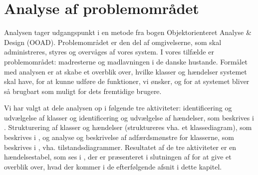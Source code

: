 \chapter{Analyse af problemområdet}
\label{chap:analyseafpo}

Analysen tager udgangspunkt i en metode fra bogen Objektorienteret Analyse \& Design (OOAD)\cite[s. ~43]{ooad}. Problemområdet er den del af omgivelserne, som skal administreres, styres og overvåges af vores system. I vores tilfælde er problemområdet: madresterne og madlavningen i de danske hustande. Formålet med analysen er at skabe et overblik over, hvilke klasser og hændelser systemet skal have, for at kunne udføre de funktioner, vi ønsker, og for at systemet bliver så brugbart som muligt for dets fremtidige brugere. 

Vi har valgt at dele analysen op i følgende tre aktiviteter: identificering og udvælgelse af klasser og identificering og udvælgelse af hændelser, som beskrives i . Strukturering af klasser og hændelser (struktureres vha. et klassediagram), som beskrives i , og analyse og beskrivelse af adfærdsmønstre for klasserne, som beskrives i , vha. tilstandsdiagrammer. Resultatet af de tre aktiviteter er en hændelsestabel, som ses i , der er præsenteret i slutningen af  for at give et overblik over, hvad der kommer i de efterfølgende afsnit i dette kapitel.

 
            
 
       

